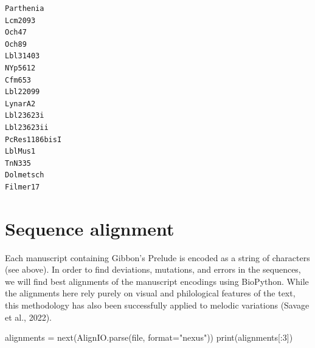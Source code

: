\documentclass[
  a4paperpaper,
  ,captions=tableheading
]{scrbook}
\newenvironment{Shaded}{\begin{snugshade}}{\end{snugshade}}
\newcommand{\BuiltInTok}[1]{\textcolor[rgb]{0.00,0.23,0.31}{#1}}
\newcommand{\DecValTok}[1]{\textcolor[rgb]{0.68,0.00,0.00}{#1}}
\newcommand{\NormalTok}[1]{\textcolor[rgb]{0.00,0.23,0.31}{#1}}
\newcommand{\OperatorTok}[1]{\textcolor[rgb]{0.37,0.37,0.37}{#1}}
\newcommand{\StringTok}[1]{\textcolor[rgb]{0.13,0.47,0.30}{#1}}
\begin{document}
\begin{verbatim}
Parthenia
Lcm2093
Och47
Och89
Lbl31403
NYp5612
Cfm653
Lbl22099
LynarA2
Lbl23623i
Lbl23623ii
PcRes1186bisI
LblMus1
TnN335
Dolmetsch
Filmer17
\end{verbatim}

\hypertarget{sequence-alignment}{%
\section{Sequence alignment}\label{sequence-alignment}}

Each manuscript containing Gibbon's Prelude is encoded as a string of
characters (see above). In order to find deviations, mutations, and
errors in the sequences, we will find best alignments of the manuscript
encodings using BioPython. While the alignments here rely purely on
visual and philological features of the text, this methodology has also
been successfully applied to melodic variations (Savage et al., 2022).

\begin{Shaded}
\begin{Highlighting}[]
\NormalTok{alignments }\OperatorTok{=} \BuiltInTok{next}\NormalTok{(AlignIO.parse(}\BuiltInTok{file}\NormalTok{, }\BuiltInTok{format}\OperatorTok{=}\StringTok{"nexus"}\NormalTok{))}
\BuiltInTok{print}\NormalTok{(alignments[:}\DecValTok{3}\NormalTok{])}
\end{Highlighting}
\end{Shaded}
\end{document}
